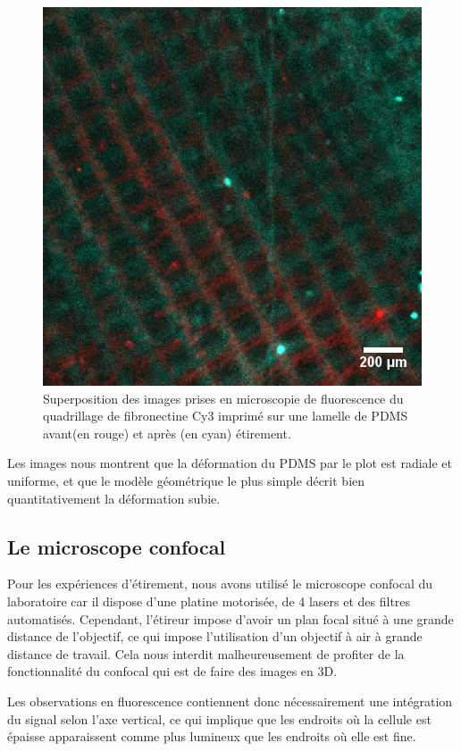 \begin{figure}
\includegraphics[scale=0.3]{Figures/Zoom_Calibration_etireur.png} 

\caption{Superposition des images prises en microscopie de fluorescence du quadrillage de fibronectine Cy3 imprimé sur une lamelle de PDMS avant(en rouge) et après (en cyan) étirement. }
\end{figure}
	Les images nous montrent que la déformation du PDMS par le plot est radiale et uniforme, et que le modèle géométrique le plus simple décrit bien quantitativement la déformation subie. 
	
	\subsection{Le microscope confocal}
	
	Pour les expériences d'étirement, nous avons utilisé le microscope confocal du laboratoire car il dispose d'une platine motorisée, de 4 lasers et des filtres automatisés. Cependant, l'étireur impose d'avoir un plan focal situé à une grande distance de l'objectif, ce qui impose l'utilisation d'un objectif à air à grande distance de travail. Cela nous interdit malheureusement de profiter de la fonctionnalité du confocal qui est de faire des images en 3D. 
	
	Les observations en fluorescence contiennent donc nécessairement une intégration du signal selon l'axe vertical, ce qui implique que les endroits où la cellule est épaisse apparaissent comme plus lumineux que les endroits où elle est fine. 
	
